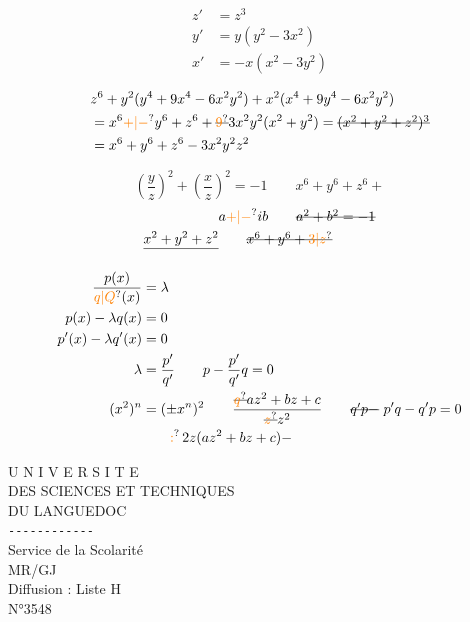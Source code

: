 \[
\begin{aligned}
z'&=z^3\\
y'&=y(y^2-3x^2)\\
x'&=-x(x^2-3y^2)
\end{aligned}
\]

\[
\begin{aligned}
&z^6+y^2(y^4+9x^4-6x^2y^2)+x^2(x^4+9y^4-6x^2y^2)\\
&=x^6\unsure{+|-}y^6+z^6+\deleted{\unsure{9}}3x^2y^2(x^2+y^2)=\deleted{(x^2+y^2+z^2)^3}\\
&=x^6+y^6+z^6-3x^2y^2z^2
\end{aligned}
\]

\[
\left(\frac yz\right)^2+\left(\frac xz\right)^2=-1
\qquad x^6+y^6+z^6+
\]
\[
\begin{aligned}
& a\unsure{+|-}ib \qquad \deleted{a^2+b^2=-1}\\
\deleted{x^2+y^2+z^2}&\qquad\deleted{x^6+y^6+\unsure{3|z}}
\end{aligned}
\]


\[
\begin{aligned}
\frac{p(x)}{\unsure{q|Q}(x)}&=\lambda\\
p(x)-\lambda q(x)&=0\\
p'(x)-\lambda q'(x)&=0\\
\lambda&=\frac{p'}{q'}\qquad p-\frac{p'}{q'}q=0\\
(x^2)^n&=(\pm x^n)^2 \qquad
\frac{\deleted{\unsure{q}}az^2+bz+c}{\deleted{\unsure{z}}z^2}
\qquad\deleted{q'p-}\ p'q-q'p=0\\
&\qquad \unsure{:}\,2z(az^2+bz+c)-
\end{aligned}
\]

U N I V E R S I T E\\
DES SCIENCES ET TECHNIQUES\\
DU LANGUEDOC\\
\texttt{-{}-{}-{}-{}-{}-{}-{}-{}-{}-{}-{}-}\\
Service de la Scolarité\\
MR/GJ\\
Diffusion : Liste H\\
N°3548

